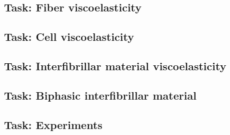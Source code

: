\documentclass{article}
\begin{document}
\subsection{Task: Fiber viscoelasticity}

\subsection{Task: Cell viscoelasticity}

\subsection{Task: Interfibrillar material viscoelasticity}

\subsection{Task: Biphasic interfibrillar material}

\subsection{Task: Experiments}
\end{document}
